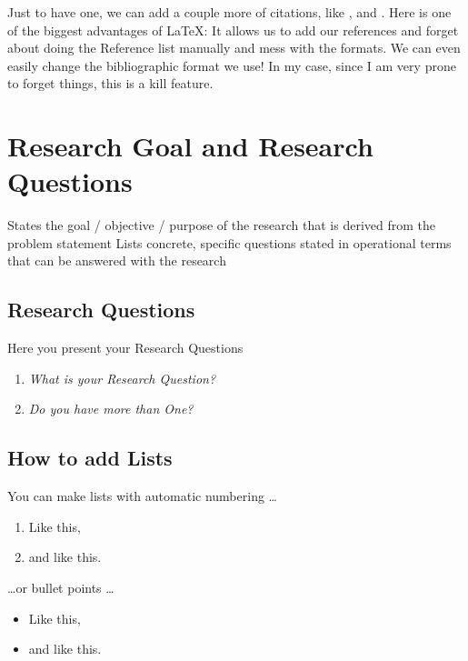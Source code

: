\documentclass{article}
\begin{document}
Just to have one, we can add a couple more of citations, like \cite{lempinenConstructingDesignFramework2012}, \cite{menichinelliResearchDesignFramework2019} and \cite{andersonFrameworkDevelopingAlternative2021}. Here is one of the biggest advantages of \LaTeX: \hspace{1pt} It allows us to add our references and forget about doing the Reference list manually and mess with the formats. We can even easily change the bibliographic format we use! In my case, since I am very prone to forget things, this is a kill feature.

\section{Research Goal and Research Questions}
States the goal / objective / purpose of the research that is derived from the problem statement
Lists concrete, specific questions stated in operational terms that can be answered with the research

\subsection{Research Questions}
Here you present your Research Questions
\begin{enumerate}
    \item \textit{ What is your Research Question?}
    \item \textit{Do you have more than One?}
\end{enumerate}

\subsection{How to add Lists}

You can make lists with automatic numbering \dots
\begin{enumerate}
\item Like this,
\item and like this.
\end{enumerate}
\dots or bullet points \dots
\begin{itemize}
\item Like this,
\item and like this.
\end{itemize}
\end{document}
